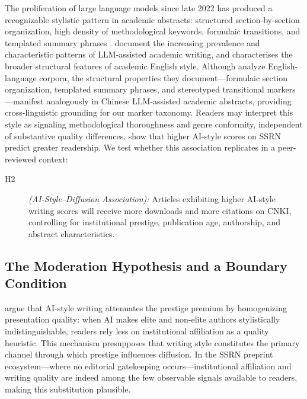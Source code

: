\documentclass[12pt,a4paper]{article}
\begin{document}
The proliferation of large language models since late 2022 has produced
a recognizable stylistic pattern in academic abstracts: structured
section-by-section organization, high density of methodological keywords,
formulaic transitions, and templated summary phrases
\citep{Liang2024,Biber2016}.
\citet{Liang2024} document the increasing prevalence and characteristic
patterns of LLM-assisted academic writing, and \citet{Biber2016}
characterises the broader structural features of academic English style.
Although \citet{Biber2016} analyze English-language corpora, the
structural properties they document---formulaic section organization,
templated summary phrases, and stereotyped transitional markers---manifest
analogously in Chinese LLM-assisted academic abstracts, providing
cross-linguistic grounding for our marker taxonomy.
Readers may interpret this style as signaling methodological
thoroughness and genre conformity, independent of substantive quality
differences.
\citet{JoLi2026} show that higher AI-style scores on SSRN predict
greater readership.
We test whether this association replicates in a peer-reviewed context:
\begin{description}
  \item[H2] \textit{(AI-Style--Diffusion Association):}
  Articles exhibiting higher AI-style writing scores will receive
  more downloads and more citations on CNKI, controlling for
  institutional prestige, publication age, authorship, and abstract
  characteristics.
\end{description}

\subsection{The Moderation Hypothesis and a Boundary Condition}

\citet{JoLi2026} argue that AI-style writing attenuates the prestige
premium by homogenizing presentation quality: when AI makes elite and
non-elite authors stylistically indistinguishable, readers rely less
on institutional affiliation as a quality heuristic.
This mechanism presupposes that writing style constitutes the primary
channel through which prestige influences diffusion.
In the SSRN preprint ecosystem---where no editorial gatekeeping
occurs---institutional affiliation and writing quality are indeed
among the few observable signals available to readers, making this
substitution plausible.
\end{document}
